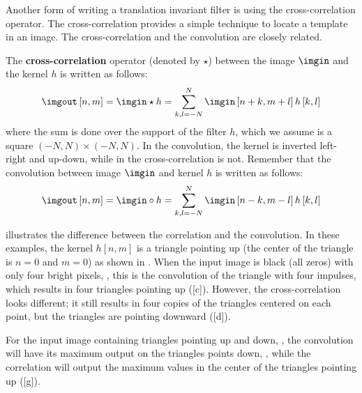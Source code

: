 Another form of writing a translation invariant filter is using the cross-correlation operator. The cross-correlation provides a simple technique to locate a template in an image.
The cross-correlation and the convolution are closely related. 


The {\bf cross-correlation} operator (denoted by $\star$) between the image $\imgin$ and the kernel $h$ is written as follows:
\begin{equation}
\imgout \left[n,m\right] = \imgin \star h =  \sum_{k,l=-N}^N \imgin \left[n+k,m+l \right] h \left[k,l \right] 
\end{equation}
where the sum is done over the support of the filter $h$, which we assume is a square $(-N,N)\times(-N,N)$. 
In the convolution, the kernel is inverted left-right and up-down, while in the cross-correlation is not. Remember that the convolution between image $\imgin$ and kernel $h$ is written as follows:
\begin{equation}
\imgout \left[n,m\right] = \imgin \circ h = \sum_{k,l=-N}^N \imgin \left[n-k,m-l \right] h \left[k,l \right]
\end{equation}



\Fig{\ref{fig:corrvsconv}} illustrates the difference between the correlation and the convolution. In these examples, the kernel $h[n,m]$ is a triangle pointing up (the center of the triangle is $n=0$ and $m=0$) as shown in . When the input image is black (all zeros) with only four bright pixels, , this is the convolution of the triangle with four impulses, which results in four triangles pointing up (\fig{\ref{fig:corrvsconv}}[c]). However, the cross-correlation looks different; it still results in four copies of the triangles centered on each point, but the triangles are pointing downward (\fig{\ref{fig:corrvsconv}}[d]).

For the input image containing triangles pointing up and down, , the convolution will have its maximum output on the triangles points down, , while the correlation will output the maximum values in the center of the triangles pointing up (\fig{\ref{fig:corrvsconv}}[g]). 


